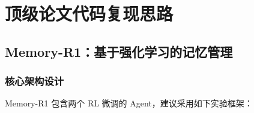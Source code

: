 \documentclass[11pt,a4paper]{article}
\begin{document}
\section{顶级论文代码复现思路}

\subsection{Memory-R1：基于强化学习的记忆管理}

\subsubsection{核心架构设计}

Memory-R1 包含两个 RL 微调的 Agent，建议采用如下实验框架：
\end{document}
